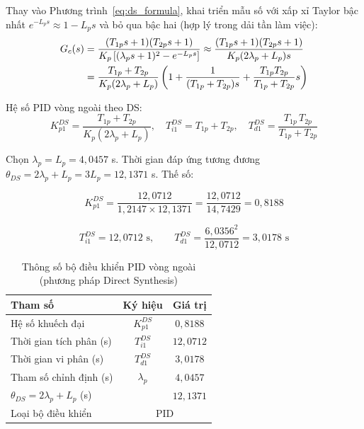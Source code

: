 \documentclass[../main.tex]{subfiles}
\begin{document}
Thay vào Phương trình~\ref{eq:ds_formula}, khai triển mẫu số với xấp xỉ Taylor bậc nhất $e^{-L_p s} \approx 1 - L_p s$ và bỏ qua bậc hai (hợp lý trong dải tần làm việc):
\begin{align}
    G_{c}(s) &= \frac{(T_{1p} s + 1)(T_{2p} s + 1)}{K_p \left[(\lambda_p s + 1)^2 - e^{-L_p s}\right]} \approx \frac{(T_{1p} s + 1)(T_{2p} s + 1)}{K_p (2\lambda_p + L_p) s} \notag \\
    &= \frac{T_{1p} + T_{2p}}{K_p(2\lambda_p + L_p)} \left(1 + \frac{1}{(T_{1p} + T_{2p}) s} + \frac{T_{1p} T_{2p}}{T_{1p} + T_{2p}} s\right)
    \label{eq:ds_pid_outer}
\end{align}

Hệ số PID vòng ngoài theo DS:
\begin{equation}
    K_{p1}^{DS} = \frac{T_{1p} + T_{2p}}{K_p (2\lambda_p + L_p)}, \quad T_{i1}^{DS} = T_{1p} + T_{2p}, \quad T_{d1}^{DS} = \frac{T_{1p}\, T_{2p}}{T_{1p} + T_{2p}}
    \label{eq:ds_pid_params_outer}
\end{equation}

Chọn $\lambda_p = L_p = 4{,}0457$ s. Thời gian đáp ứng tương đương $\theta_{DS} = 2\lambda_p + L_p = 3L_p = 12{,}1371$ s. Thế số:

\[
K_{p1}^{DS} = \frac{12{,}0712}{1{,}2147 \times 12{,}1371} = \frac{12{,}0712}{14{,}7429} = 0{,}8188
\]

\[
T_{i1}^{DS} = 12{,}0712 \text{ s}, \qquad T_{d1}^{DS} = \frac{6{,}0356^2}{12{,}0712} = 3{,}0178 \text{ s}
\]

\begin{table}[H]
\centering
\caption{Thông số bộ điều khiển PID vòng ngoài (phương pháp Direct Synthesis)}
\label{tab:tham_so_pid_vong_ngoai_ds}
\begin{tabular}{|l|c|c|}
\hline
\textbf{Tham số} & \textbf{Ký hiệu} & \textbf{Giá trị}\\ \hline
Hệ số khuếch đại & $K_{p1}^{DS}$ & $0{,}8188$\\ \hline
Thời gian tích phân (s) & $T_{i1}^{DS}$ & $12{,}0712$\\ \hline
Thời gian vi phân (s) & $T_{d1}^{DS}$ & $3{,}0178$\\ \hline
Tham số chỉnh định (s) & $\lambda_p$ & $4{,}0457$\\ \hline
$\theta_{DS} = 2\lambda_p + L_p$ (s) & & $12{,}1371$\\ \hline
Loại bộ điều khiển & \multicolumn{2}{c|}{PID}\\ \hline
\end{tabular}
\end{table}
\end{document}
